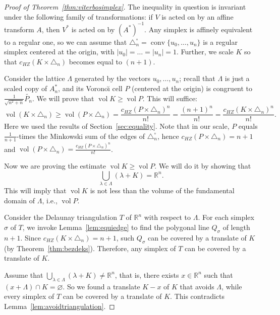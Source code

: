 \documentclass[12pt,a4paper,oneside]{amsart}
\theoremstyle{definition}
\theoremstyle{remark}
\numberwithin{equation}{section}
\DeclareMathOperator{\volu}{vol}
\DeclareMathOperator{\conv}{conv}
\begin{document}
\begin{proof}[Proof of Theorem~\ref{thm:viterbosimplex}]

The inequality in question is invariant under the following family of transformations: if $V$ is acted on by an affine transform $A$, then $V^*$ is acted on by $(A^*)^{-1}$. Any simplex is affinely equivalent to a regular one, so we can assume that $\triangle_n^\circ = \conv\{u_0, \ldots, u_n\}$ is a regular simplex centered at the origin, with $|u_0| = \ldots = |u_n| = 1$. Further, we scale $K$ so that $c_{HZ}(K \times \triangle_n)$ becomes equal to $(n+1)$.

Consider the lattice $\Lambda$ generated by the vectors $u_0, \ldots, u_n$; recall that $\Lambda$ is just a scaled copy of $A_n^*$, and its Vorono\u{\i} cell $P$ (centered at the origin) is congruent to $\frac{1}{\sqrt{n^2+n}} \widetilde{P_n}$.
We will prove that $\volu K \ge \volu P$. This will suffice:
$$
\volu (K \times \triangle_n) \ge \volu (P \times \triangle_n) = \frac{c_{HZ}(P \times \triangle_n)^n}{n!} = \frac{(n+1)^n}{n!} = \frac{c_{HZ}(K \times \triangle_n)^n}{n!}.
$$
Here we used the results of Section~\ref{sec:equality}. Note that in our scale, $P$ equals $\frac{1}{n+1}$-times the Minkowski sum of the edges of $\triangle_n^\circ$, hence $c_{HZ}(P \times \triangle_n) = n+1$ and $\volu (P \times \triangle_n) = \frac{c_{HZ}(P \times \triangle_n)^n}{n!}$.

Now we are proving the estimate $\volu K \ge \volu P$. We will do it by showing that
$$
\bigcup_{\lambda \in \Lambda} (\lambda + K) = \mathbb{R}^n.
$$
This will imply that $\volu K$ is not less than the volume of the fundamental domain of $\Lambda$, i.e., $\volu P$.

Consider the Delaunay triangulation $T$ of $\mathbb{R}^n$ with respect to $\Lambda$. For each simplex $\sigma$ of $T$, we invoke Lemma~\ref{lem:equiedge} to find the polygonal line $Q_\sigma$ of length $n+1$. Since $c_{HZ}(K \times \triangle_n) = n+1$, such $Q_\sigma$ can be covered by a translate of $K$ (by Theorem~\ref{thm:bezdeks}). Therefore, any simplex of $T$ can be covered by a translate of $K$.

Assume that $\bigcup\limits_{\lambda \in \Lambda} (\lambda + K) \neq \mathbb{R}^n$, that is, there exists $x \in \mathbb{R}^n$ such that $(x + \Lambda) \cap K = \varnothing$. So we found a translate $K - x$ of $K$ that avoids $\Lambda$, while every simplex of $T$ can be covered by a translate of $K$. This contradicts Lemma~\ref{lem:avoidtriangulation}.
\end{proof}
\end{document}

